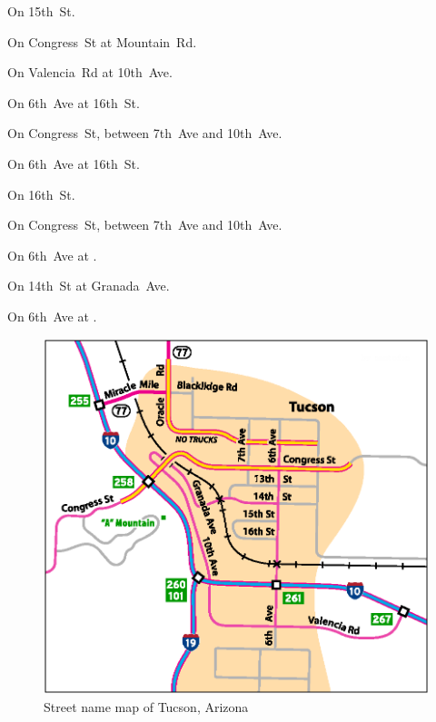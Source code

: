 \pagebreak[3]

\begin{LocationList}

On 15th~St.

On Congress~St at  Mountain~Rd.

On Valencia~Rd at 10th~Ave.

On 6th~Ave at 16th~St.

\Location{\GarageHQ \Garage}
On Congress~St, between 7th~Ave and 10th~Ave.

\Location{\GasStation \Gas}
On 6th~Ave at 16th~St.

On 16th~St.

\Location{\RecruitmentAgency \Recruitment}
On Congress~St, between 7th~Ave and 10th~Ave.

On 6th~Ave at  .

On 14th~St at Granada~Ave.

On 6th~Ave at  .

\end{LocationList}

\begin{figure}[hp]
\includegraphics[scale=0.88]{cities/arizona/tucson}
\centering\caption{Street name map of Tucson, Arizona}
\end{figure}
\pagebreak[4]
